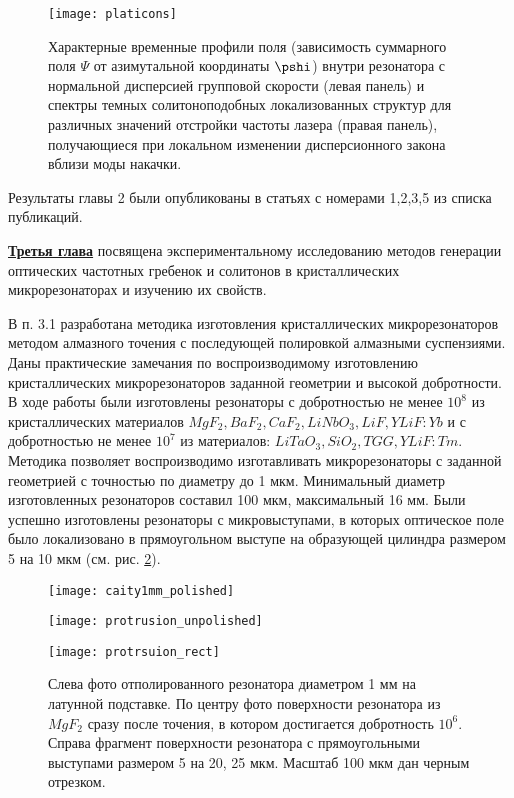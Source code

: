 \begin{figure}
  \centering
  \texttt{[image: platicons]}
  \caption{Характерные временные профили поля (зависимость суммарного поля $\Psi$ от азимутальной координаты $\pshi$) внутри резонатора с нормальной дисперсией групповой скорости (левая панель) и спектры темных солитоноподобных локализованных структур для различных значений отстройки частоты лазера (правая панель), получающиеся при локальном изменении дисперсионного закона вблизи моды накачки.}
  \label{platicons}
\end{figure}

Результаты главы 2 были опубликованы в статьях с номерами 1,2,3,5 из списка публикаций.

\underline{\textbf{Третья глава}} посвящена экспериментальному исследованию методов генерации оптических частотных гребенок и солитонов в кристаллических микрорезонаторах и изучению их свойств.

В п. 3.1 разработана методика изготовления кристаллических микрорезонаторов методом алмазного точения с последующей полировкой алмазными суспензиями. Даны практические замечания по воспроизводимому изготовлению кристаллических микрорезонаторов заданной геометрии и высокой добротности. В ходе работы были изготовлены резонаторы с добротностью не менее $10^8$ из кристаллических материалов $MgF_2,BaF_2,CaF_2,LiNbO_3,LiF,YLiF:Yb$ и с добротностью не менее $10^7$ из материалов: $LiTaO_3,SiO_2,TGG,YLiF:Tm$. Методика позволяет воспроизводимо изготавливать микрорезонаторы с заданной геометрией с точностью по диаметру до 1 мкм. Минимальный диаметр изготовленных резонаторов составил 100 мкм, максимальный 16 мм. Были успешно изготовлены резонаторы с микровыступами, в которых оптическое поле было локализовано в прямоугольном выступе на образующей цилиндра размером 5 на 10 мкм (см. рис. \ref{cavity_polished}).

\begin{figure}[ht]
  \begin{minipage}[ht]{0.32\linewidth}\centering
    \texttt{[image: caity1mm\_polished]}
  \end{minipage}
  \hfill
  \begin{minipage}[ht]{0.32\linewidth}\centering
    \texttt{[image: protrusion\_unpolished]}
  \end{minipage}
  \hfill
  \begin{minipage}[ht]{0.32\linewidth}\centering
    \texttt{[image: protrsuion\_rect]}
  \end{minipage}
  \caption{Слева фото отполированного резонатора диаметром 1 мм на латунной подставке. По центру фото поверхности резонатора из $MgF_2$ сразу после точения, в котором достигается добротность $10^6$. Справа фрагмент поверхности резонатора с прямоугольными выступами размером 5 на 20, 25 мкм. Масштаб 100 мкм дан черным отрезком.}
  \label{cavity_polished}
\end{figure}

